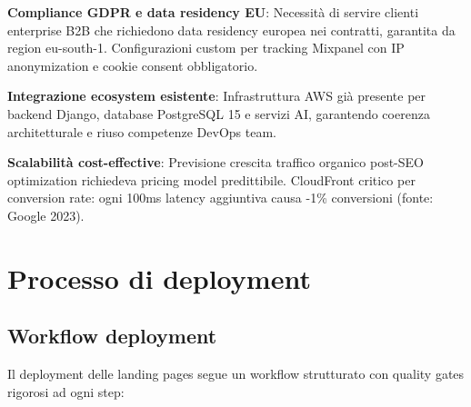 \textbf{Compliance GDPR e data residency EU}: Necessità di servire clienti enterprise B2B che richiedono data residency europea nei contratti, garantita da region eu-south-1. Configurazioni custom per tracking Mixpanel con IP anonymization e cookie consent obbligatorio.

\textbf{Integrazione ecosystem esistente}: Infrastruttura AWS già presente per backend Django, database PostgreSQL 15 e servizi AI, garantendo coerenza architetturale e riuso competenze DevOps team.

\textbf{Scalabilità cost-effective}: Previsione crescita traffico organico post-SEO optimization richiedeva pricing model predittibile. CloudFront critico per conversion rate: ogni 100ms latency aggiuntiva causa -1\% conversioni (fonte: Google 2023).

\section{Processo di deployment}

\subsection{Workflow deployment}

Il deployment delle landing pages segue un workflow strutturato con quality gates rigorosi ad ogni step:

